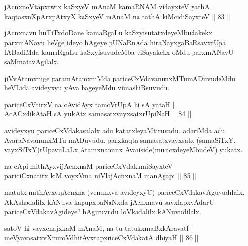 \begin{shl}
jAcnxnoVtapxtwtx kaSxyeV mAnaM kamaRNAM vidayxteV yathA |\\
kaqtasxnXpArxpAtxyX kaSxyeV mAnaM na tathA kiMcidiSayxteV \hfill || 83 ||
\end{shl}

\begin{artha}
jAcnxnavu huTiTxdoDane kamaRgaLu kaSxyisutatxdeyeMbudakekx parxmANavu heVge ideyo hAgeye pUNaRnAda hiraNayxgaBaRsavxrUpa lABadiMda kamaRgaLu kaSxyisuvudeMba viSayakekx oMdu parxmANavU saMmatavAgilalx.
\end{artha}

\begin{artha}
jiVvAtamxnige paramAtamxniMda pariceCxVdavanunxMTumADuvudeMdu heVLida avideyxyu yAva bageyeMdu vimashiRsuvudu.
\end{artha}


\begin{shl}
pariceCxVtirxV na cAvidAyx tamoVrUpA hi sA yataH |\\
AcACxdikA\s taH sA yukAtx samasatxvayxsatxrUpiNaH \hfill || 84 ||
\end{shl}

\begin{artha}
avideyxyu pariceCxVdakavalalx adu katatxleyaMtiruvadu. adariMda adu AvaraNavanunxMTu mADuvudu. parxkaqta samasatxvayxsatx (samaSiTxY. vayxSiTxY)rUpavuLaLx Atamxnanunx Avariside(mucicxdeyeMbudeV) yukatx.
\end{artha}

\begin{shl}
na cApi mithAyxvijAcnxnaM pariceCxVdakamiSayxteV |\\
pariciCxnatitx kiM voyxVma niVlajAcnxnaM manAgapi \hfill || 85 ||
\end{shl}

\begin{artha}
matutx mithAyxvijAcnxna (venunxva avideyxyU) pariceCxVdakavAguvudilalx, AkAshadalilx 
kANuva kapupxbaNaNxda jAcnxnavu savxlapxvAdarU pariceCxVdakavAgideye? hAgiruvudu loVkadalilx 
kANuvudilalx.
\end{artha}

\begin{shl}
satoV hi vayxcnajxkaM mAnaM, na tu tatukxmaBxkAravatf |\\
meVyavasatxvXnuroVdhitAvxtapxriceCxVdakatA dhiyaH \hfill || 86 ||
\end{shl}

